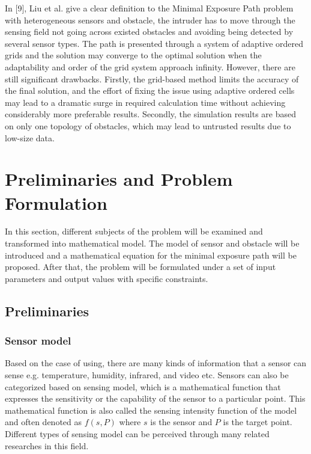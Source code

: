 \documentclass[final]{elsarticle}
\begin{document}
In [9], Liu et al. give a clear definition to the Minimal Exposure Path problem with heterogeneous sensors and obstacle, the intruder has to move through the sensing field not going across existed obstacles and avoiding being detected by several sensor types. The path is presented through a system of adaptive ordered grids and the solution may converge to the optimal solution when the adaptability and order of the grid system approach infinity. However, there are still significant drawbacks. Firstly, the grid-based method limits the accuracy of the final solution, and the effort of fixing the issue using adaptive ordered cells may lead to a dramatic surge in required calculation time without achieving considerably more preferable results. Secondly, the simulation results are based on only one topology of obstacles, which may lead to untrusted results due to low-size data.

\section{Preliminaries and Problem Formulation}

In this section, different subjects of the problem will be examined and transformed into mathematical model. The model of sensor and obstacle will be introduced and a mathematical equation for the minimal exposure path will be proposed. After that, the problem will be formulated under a set of input parameters and output values with specific constraints.

\subsection{Preliminaries}

\subsubsection{Sensor model}

Based on the case of using, there are many kinds of information that a sensor can sense e.g. temperature, humidity, infrared, and video etc. Sensors can also be categorized based on sensing model, which is a mathematical function that expresses the sensitivity or the capability of the sensor to a particular point. This mathematical function is also called the sensing intensity function of the model and often denoted as $f(s, P)$ where $ s $ is the sensor and $ P $ is the target point. Different types of sensing model can be perceived through many related researches in this field.
\end{document}
